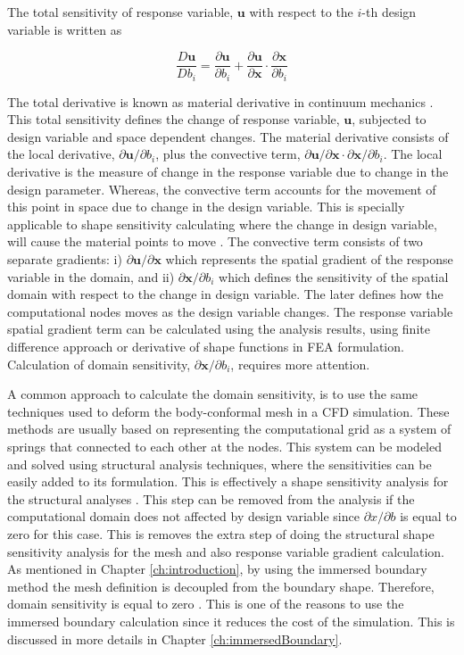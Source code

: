 The total sensitivity of response variable, $\mathbf{u}$ with respect to the $i$-th design variable is written as

\begin{equation}\label{eq:C2_totalSensitivityDef}
	\frac{D \mathbf{u}}{D b_i} = 
	\frac{\partial \mathbf{u}}{\partial b_i} + 
	\frac{\partial \mathbf{u}}{\partial \mathbf{x}} \cdot
	\frac{\partial \mathbf{x}}{\partial b_i} 
\end{equation}

The total derivative is known as material derivative in continuum mechanics \cite{mase2009continuum}. This total sensitivity defines the change of response variable, $\mathbf{u}$, subjected to design variable and space dependent changes. The material derivative consists of the local derivative, $\partial \mathbf{u}/\partial b_i$, plus the convective term, $\partial \mathbf{u}/\partial \mathbf{x} \cdot \partial \mathbf{x}/\partial b_i$. The local derivative is the measure of change in the response variable due to change in the design parameter. Whereas, the convective term accounts for the movement of this point in space due to change in the design variable. This is specially applicable to shape sensitivity calculating where the change in design variable, will cause the material points to move \cite{cross2014local}. The convective term consists of two separate gradients: i) $\partial \mathbf{u} / \partial \mathbf{x}$ which represents the spatial gradient of the response variable in the domain, and ii) $\partial \mathbf{x} / \partial b_i$ which defines the sensitivity of the spatial domain with respect to the change in design variable. The later defines how the computational nodes moves as the design variable changes. The response variable spatial gradient term can be calculated using the analysis results, using finite difference approach or derivative of shape functions in FEA formulation. Calculation of domain sensitivity, $\partial \mathbf{x} / \partial b_i$, requires more attention.

A common approach to calculate the domain sensitivity, is to use the same techniques used to deform the body-conformal mesh in a CFD simulation. These methods are usually based on representing the computational grid as a system of springs that connected to each other at the nodes. This system can be modeled and solved using structural analysis techniques, where the sensitivities can be easily added to its formulation. This is effectively a shape sensitivity analysis for the structural analyses \cite{haftka1986structural}. This step can be removed from the analysis if the computational domain does not affected by design variable since $\partial x/\partial b$ is equal to zero for this case. This is removes the extra step of doing the structural shape sensitivity analysis for the mesh and also response variable gradient calculation. As mentioned in Chapter \ref{ch:introduction}, by using the immersed boundary method the mesh definition is decoupled from the boundary shape. Therefore, domain sensitivity is equal to zero \cite{gobal2014continuum}. This is one of the reasons to use the immersed boundary calculation since it reduces the cost of the simulation. This is discussed in more details in Chapter \ref{ch:immersedBoundary}.

